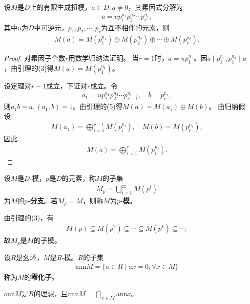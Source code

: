 \documentclass[../../main.tex]{subfiles}%
\begin{document}
\begin{theorem}
设$M$是$D$上的有限生成扭模，$a\in D,a\neq0$，其素因式分解为
\begin{align*}
a=up_1^{n_1}p_2^{n_2}\cdots p_r^{n_r},
\end{align*}
其中$u$为$D$中可逆元，$p_1,p_2,\cdots,p_r$为互不相伴的元素，则
\begin{align*}
M(a)=M(p_1^{n_1})\oplus M(p_2^{n_2})\oplus\cdots\oplus M(p_r^{n_r}).
\end{align*}
\end{theorem}
\begin{proof}

对素因子个数$r$用数学归纳法证明。
当$r=1$时，$a=up_1^{n_1}$。因$a\mid p_1^{n_1},p_1^{n_1}\mid a$，由引理的(3)得$M(a)=M(p_1^{n_1})$。

设定理对$r-1$成立，下证对$r$成立。令
\begin{align*}
a_1=up_1^{n_1}p_2^{n_2}\cdots p_{r-1}^{n_{r-1}},\quad b=p_r^{n_r},
\end{align*}
则$a_1b=a,(a_1,b)=1$。由引理的(5)得$M(a)=M(a_1)\oplus M(b)$。
由归纳假设
\begin{align*}
M(a_1)=\bigoplus\limits_{i=1}^{r-1}M(p_i^{n_i}),\quad M(b)=M(p_r^{n_r}),
\end{align*}
因此
\begin{align*}
M(a)=\bigoplus\limits_{i=1}^{r}M(p_i^{n_i}).
\end{align*}

\end{proof}

\begin{definition}
设$M$是$D$-模，$p$是$D$的元素，称$M$的子集
\begin{align*}
M_p=\bigcup\limits_{i=1}^{\infty}M(p^i)
\end{align*}
为$M$的\textbf{$p$-分支}。若$M_p=M$，则称$M$为\textbf{$p$-模}。
\end{definition}
\begin{remark}
由引理的(3)，有
\begin{align*}
M(p)\subseteq M(p^2)\subseteq\cdots\subseteq M(p^k)\subseteq\cdots,
\end{align*}
故$M_p$是$M$的子模。
\end{remark}

\begin{definition}
设$R$是幺环，$M$是$R$-模。$R$的子集
\begin{align*}
\mathrm{ann}M=\{a\in R\mid ax=0,\forall x\in M\}
\end{align*}
称为$M$的\textbf{零化子}。
\end{definition}
\begin{remark}
$\mathrm{ann}M$是$R$的理想，且$\mathrm{ann}M=\bigcap\limits_{x\in M}\mathrm{ann}x$。
\end{remark}
\end{document}
